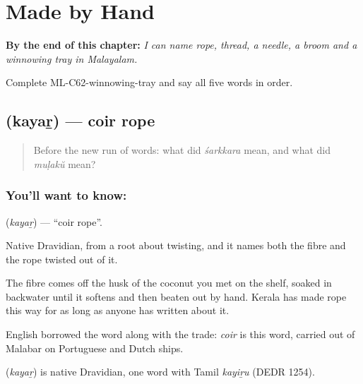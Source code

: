 
\chapter{Made by Hand}
\label{ch:ml-made-by-hand}

\begin{chapteropening}
\textbf{By the end of this chapter:} \emph{I can name rope, thread, a needle, a broom and a winnowing tray in Malayalam.}

Complete ML-C62-winnowing-tray and say all five words in order.
\end{chapteropening}

\section[\texorpdfstring{\ml{കയർ} (kayaṟ)}{കയർ (kayaṟ)}]{ (kayaṟ) — coir rope}

\label{lesson:ML-C62-rope}



\begin{quote}
Before the new run of words: what did \emph{śarkkara} mean, and what did \emph{muḷakŭ} mean?
\end{quote}

\subsection*{You'll want to know: }
\textbf{} (\emph{kayaṟ}) — \textquotedblleft{}coir rope\textquotedblright{}.

Native Dravidian, from a root about twisting, and it names both the fibre and the rope twisted out of it.

The fibre comes off the husk of the coconut you met on the shelf, soaked in backwater until it softens and then beaten out by hand. Kerala has made rope this way for as long as anyone has written about it.

English borrowed the word along with the trade: \emph{coir} is this word, carried out of Malabar on Portuguese and Dutch ships.

\begin{cousinweb}
\textbf{} (\emph{kayaṟ}) is native Dravidian, one word with Tamil \emph{kayiṟu} (DEDR 1254).
\end{cousinweb}


